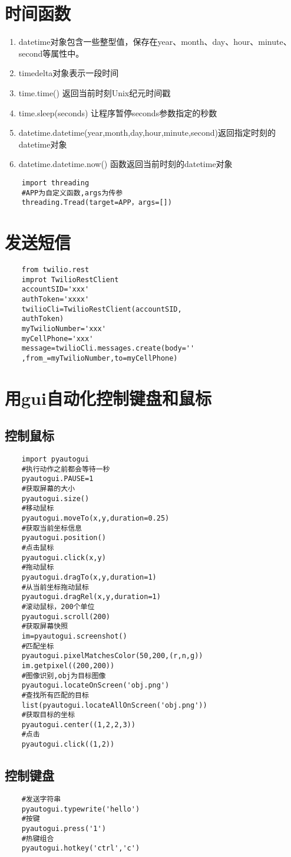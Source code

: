 \documentclass[twocolumn]{article}
\begin{document}
	\section{时间函数}
	\begin{enumerate}
		\item datetime对象包含一些整型值，保存在year、month、day、hour、minute、second等属性中。
		\item timedelta对象表示一段时间
		\item time.time() 返回当前时刻Unix纪元时间戳
		\item time.sleep(seconds) 让程序暂停seconds参数指定的秒数
		\item datetime.datetime(year,month,day,hour,minute,second)返回指定时刻的datetime对象
		\item datetime.datetime.now() 函数返回当前时刻的datetime对象
	\end{enumerate}
	\begin{lstlisting}
	import threading
	#APP为自定义函数,args为传参
	threading.Tread(target=APP，args=[])
	\end{lstlisting}
	\section{发送短信}
	\begin{lstlisting}
	from twilio.rest 
	improt TwilioRestClient
	accountSID='xxx'
	authToken='xxxx'
	twilioCli=TwilioRestClient(accountSID,
	authToken)
	myTwilioNumber='xxx'
	myCellPhone='xxx'
	message=twilioCli.messages.create(body=''
	,from_=myTwilioNumber,to=myCellPhone) 
	\end{lstlisting}
	\section{用gui自动化控制键盘和鼠标}
	\subsection{控制鼠标}
	\begin{lstlisting}
	import pyautogui
	#执行动作之前都会等待一秒
	pyautogui.PAUSE=1
	#获取屏幕的大小
	pyautogui.size()
	#移动鼠标
	pyautogui.moveTo(x,y,duration=0.25)
	#获取当前坐标信息
	pyautogui.position()
	#点击鼠标
	pyautogui.click(x,y)
	#拖动鼠标
	pyautogui.dragTo(x,y,duration=1)
	#从当前坐标拖动鼠标
	pyautogui.dragRel(x,y,duration=1)
	#滚动鼠标，200个单位
	pyautogui.scroll(200)
	#获取屏幕快照
	im=pyautogui.screenshot()
	#匹配坐标
	pyautogui.pixelMatchesColor(50,200,(r,n,g))
	im.getpixel((200,200))
	#图像识别,obj为目标图像
	pyautogui.locateOnScreen('obj.png')
	#查找所有匹配的目标
	list(pyautogui.locateAllOnScreen('obj.png'))
	#获取目标的坐标
	pyautogui.center((1,2,2,3))
	#点击
	pyautogui.click((1,2))
	\end{lstlisting}
	\subsection{控制键盘}
	\begin{lstlisting}
	#发送字符串
	pyautogui.typewrite('hello')
	#按键
	pyautogui.press('1')
	#热键组合
	pyautogui.hotkey('ctrl','c')
	\end{lstlisting}
\end{document}
